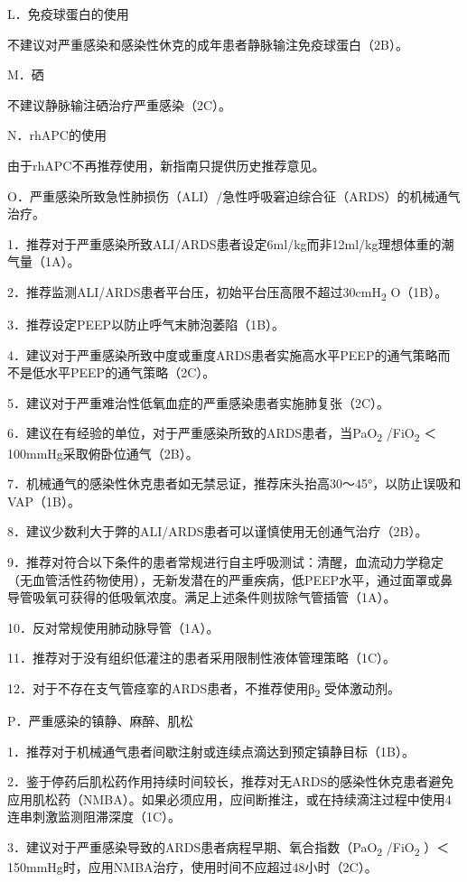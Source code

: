 L．免疫球蛋白的使用

不建议对严重感染和感染性休克的成年患者静脉输注免疫球蛋白（2B）。

M．硒

不建议静脉输注硒治疗严重感染（2C）。

N．rhAPC的使用

由于rhAPC不再推荐使用，新指南只提供历史推荐意见。

O．严重感染所致急性肺损伤（ALI）/急性呼吸窘迫综合征（ARDS）的机械通气治疗。

1．推荐对于严重感染所致ALI/ARDS患者设定6ml/kg而非12ml/kg理想体重的潮气量（1A）。

2．推荐监测ALI/ARDS患者平台压，初始平台压高限不超过30cmH\textsubscript{2}
O（1B）。

3．推荐设定PEEP以防止呼气末肺泡萎陷（1B）。

4．建议对于严重感染所致中度或重度ARDS患者实施高水平PEEP的通气策略而不是低水平PEEP的通气策略（2C）。

5．建议对于严重难治性低氧血症的严重感染患者实施肺复张（2C）。

6．建议在有经验的单位，对于严重感染所致的ARDS患者，当PaO\textsubscript{2}
/FiO\textsubscript{2} ＜100mmHg采取俯卧位通气（2B）。

7．机械通气的感染性休克患者如无禁忌证，推荐床头抬高30～45°，以防止误吸和VAP（1B）。

8．建议少数利大于弊的ALI/ARDS患者可以谨慎使用无创通气治疗（2B）。

9．推荐对符合以下条件的患者常规进行自主呼吸测试：清醒，血流动力学稳定（无血管活性药物使用），无新发潜在的严重疾病，低PEEP水平，通过面罩或鼻导管吸氧可获得的低吸氧浓度。满足上述条件则拔除气管插管（1A）。

10．反对常规使用肺动脉导管（1A）。

11．推荐对于没有组织低灌注的患者采用限制性液体管理策略（1C）。

12．对于不存在支气管痉挛的ARDS患者，不推荐使用β\textsubscript{2}
受体激动剂。

P．严重感染的镇静、麻醉、肌松

1．推荐对于机械通气患者间歇注射或连续点滴达到预定镇静目标（1B）。

2．鉴于停药后肌松药作用持续时间较长，推荐对无ARDS的感染性休克患者避免应用肌松药（NMBA）。如果必须应用，应间断推注，或在持续滴注过程中使用4连串刺激监测阻滞深度（1C）。

3．建议对于严重感染导致的ARDS患者病程早期、氧合指数（PaO\textsubscript{2}
/FiO\textsubscript{2}
）＜150mmHg时，应用NMBA治疗，使用时间不应超过48小时（2C）。

